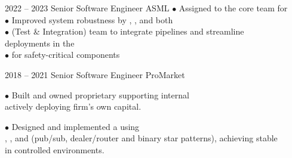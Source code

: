 \documentclass[9pt]{developercv} %
\newcommand{\myHilight}[2]{\tcbtp{\textit{\color{#1}{#2}}}}
\begin{document}
\begin{entrylist}
	\entry
		{2022 -- 2023}
		{Senior Software Engineer}
		{ASML}
		{
            $\bullet$ Assigned to the core \myHilight{textcolor}{Safety and Diagnostic} 
                      team for \myHilight{textcolor}{ASML's High-NA EUV lithography platform}\\
            $\bullet$ Improved system robustness by \myHilight{textcolor}{integrating}, 
                      \myHilight{textcolor}{refactoring}, and \myHilight{textcolor}{testing} 
                      both \myHilight{textcolor}{new and legacy code}\\
            $\bullet$ \myHilight{textcolor}{Collaborated with the T\&I} 
                      (Test \& Integration) team to integrate 
                      \myHilight{textcolor}{CI/CD} pipelines and streamline\\
                      \hspace*{0.7em}deployments in the \myHilight{textcolor}{way of working of the team}\\
            $\bullet$ \myHilight{textcolor}{Authored the software design documentation} 
                      for safety-critical components\\
        }

	\entry
	    {2018 -- 2021}
	    {Senior Software Engineer}
	    {ProMarket}
        {
            $\bullet$ Built and owned proprietary \myHilight{textcolor}{FX trading infrastructure} 
                      supporting internal \myHilight{textcolor}{prop trading teams}\\
                      \hspace*{0.7em}actively deploying firm's own capital.
        
            $\bullet$ Designed and implemented a \myHilight{textcolor}{low-latency routing and 
                      messaging infrastructure} using\\
                      \hspace*{0.7em}\myHilight{textcolor}{C++17}, \myHilight{textcolor}{Python}, and 
                      \myHilight{textcolor}{ZeroMQ} (pub/sub, dealer/router and binary star patterns), 
                      achieving stable\\ 
                      \hspace*{0.7em}\myHilight{textcolor}{latencies of $150\sim250\mu$s} in 
                      controlled environments.
        
}
\end{entrylist}
\end{document}
